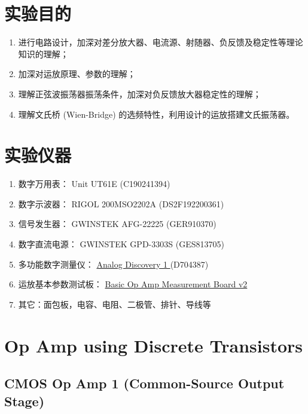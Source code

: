 \documentclass[UTF8]{article}
\begin{document}
\section{实验目的}

\begin{enumerate}
    \item 进行电路设计，加深对差分放大器、电流源、射随器、负反馈及稳定性等理论知识的理解；
    \item 加深对运放原理、参数的理解；
    \item 理解正弦波振荡器振荡条件，加深对负反馈放大器稳定性的理解；
    \item 理解文氏桥 (Wien-Bridge) 的选频特性，利用设计的运放搭建文氏振荡器。
\end{enumerate}

\section{实验仪器}

\begin{enumerate}
    \item 数字万用表： Unit UT61E (C190241394)
    \item 数字示波器： RIGOL 200MSO2202A (DS2F192200361)
    \item 信号发生器： GWINSTEK AFG-22225 (GER910370)
    \item 数字直流电源： GWINSTEK GPD-3303S (GES813705)
    \item 多功能数字测量仪： 
    \href{https://digilent.com/reference/test-and-measurement/analog-discovery/start
    }{ %
    Analog Discovery 1
    } 
    (D704387)
    \item 运放基本参数测试板：%
    \href{https://yidingg.github.io/YiDingg/\#/ElectronicDesigns/Basic\%20Op\%20Amp\%20Measurement\%20Board\%20v2
    }{ %
    Basic Op Amp Measurement Board v2
    }
    \item 其它：面包板，电容、电阻、二极管、排针、导线等
\end{enumerate}

\section{Op Amp using Discrete Transistors}

\subsection{CMOS Op Amp 1 (Common-Source Output Stage) }
\end{document}
